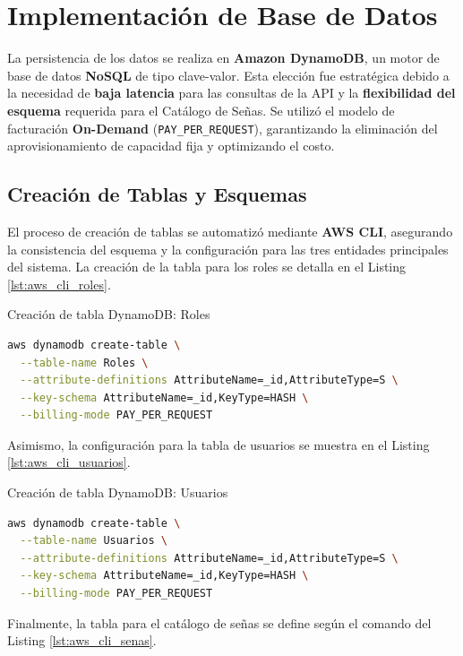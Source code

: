 \section{Implementación de Base de Datos}
La persistencia de los datos se realiza en \textbf{Amazon DynamoDB}, un motor de base de datos \textbf{NoSQL} de tipo clave-valor. Esta elección fue estratégica debido a la necesidad de \textbf{baja latencia} para las consultas de la API y la \textbf{flexibilidad del esquema} requerida para el Catálogo de Señas. Se utilizó el modelo de facturación \textbf{On-Demand} (\texttt{PAY\_PER\_REQUEST}), garantizando la eliminación del aprovisionamiento de capacidad fija y optimizando el costo.

\subsection{Creación de Tablas y Esquemas}
El proceso de creación de tablas se automatizó mediante \textbf{AWS CLI}, asegurando la consistencia del esquema y la configuración para las tres entidades principales del sistema. La creación de la tabla para los roles se detalla en el Listing \ref{lst:aws_cli_roles}.

\begin{codebox}{Creación de tabla DynamoDB: Roles}
    \begin{lstlisting}[language=bash, caption={Creación de tabla DynamoDB: Roles}, label={lst:aws_cli_roles}]
aws dynamodb create-table \
  --table-name Roles \
  --attribute-definitions AttributeName=_id,AttributeType=S \
  --key-schema AttributeName=_id,KeyType=HASH \
  --billing-mode PAY_PER_REQUEST
    \end{lstlisting}
\end{codebox}

Asimismo, la configuración para la tabla de usuarios se muestra en el Listing \ref{lst:aws_cli_usuarios}.

\begin{codebox}{Creación de tabla DynamoDB: Usuarios}
    \begin{lstlisting}[language=bash, caption={Creación de tabla DynamoDB: Usuarios}, label={lst:aws_cli_usuarios}]
aws dynamodb create-table \
  --table-name Usuarios \
  --attribute-definitions AttributeName=_id,AttributeType=S \
  --key-schema AttributeName=_id,KeyType=HASH \
  --billing-mode PAY_PER_REQUEST
    \end{lstlisting}
\end{codebox}

Finalmente, la tabla para el catálogo de señas se define según el comando del Listing \ref{lst:aws_cli_senas}.

